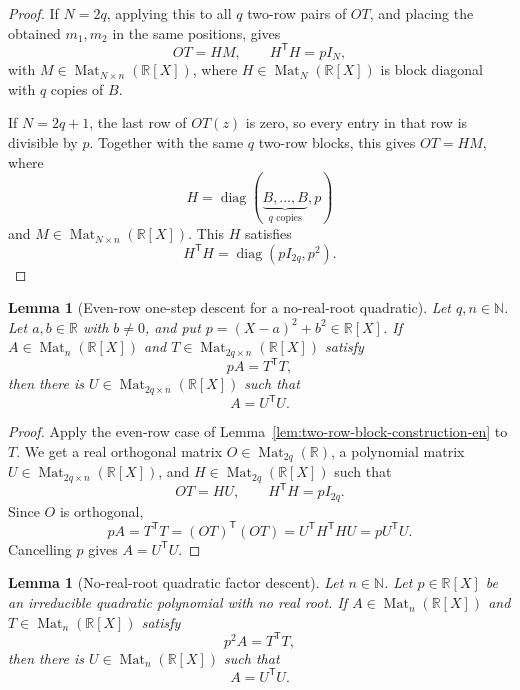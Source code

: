 \documentclass[uplatex,dvipdfmx]{jsarticle}
\newcommand{\Poly}{\mathbb{R}[X]}
\newcommand{\Mat}{\operatorname{Mat}}
\theoremstyle{matrixsosdefinition}
\newtheorem{lemma}[theorem]{Lemma}
\begin{document}
\begin{proof}
  If \(N=2q\), applying this to all \(q\) two-row pairs of \(OT\), and placing
  the obtained \(m_1,m_2\) in the same positions, gives
  \[
    OT=HM,\qquad H^{\mathsf T}H=pI_N,
  \]
  with \(M\in\Mat_{N\times n}(\Poly)\), where \(H\in\Mat_N(\Poly)\) is
  block diagonal with \(q\) copies of \(B\).

  If \(N=2q+1\), the last row of \(OT(z)\) is zero, so every entry in that row
  is divisible by \(p\).  Together with the same \(q\) two-row blocks, this gives
  \(OT=HM\), where
  \[
    H=\operatorname{diag}(\underbrace{B,\ldots,B}_{q\text{ copies}},p)
  \]
  and \(M\in\Mat_{N\times n}(\Poly)\).  This \(H\) satisfies
  \[
    H^{\mathsf T}H=\operatorname{diag}(pI_{2q},p^2).
  \]
\end{proof}

\begin{lemma}[Even-row one-step descent for a no-real-root quadratic]
\label{lem:no-real-root-even-row-one-step-en}
  Let \(q,n\in\mathbb{N}\).
  Let \(a,b\in\mathbb{R}\) with \(b\ne0\), and put
  \(p=(X-a)^2+b^2\in\Poly\).
  If \(A\in\Mat_n(\Poly)\) and \(T\in\Mat_{2q\times n}(\Poly)\) satisfy
  \[
    pA=T^{\mathsf T}T,
  \]
  then there is \(U\in\Mat_{2q\times n}(\Poly)\) such that
  \[
    A=U^{\mathsf T}U.
  \]
\end{lemma}

\begin{proof}
  Apply the even-row case of Lemma~\ref{lem:two-row-block-construction-en} to \(T\).
  We get a real orthogonal matrix \(O\in\Mat_{2q}(\mathbb{R})\), a polynomial matrix
  \(U\in\Mat_{2q\times n}(\Poly)\), and \(H\in\Mat_{2q}(\Poly)\) such that
  \[
    OT=HU,\qquad H^{\mathsf T}H=pI_{2q}.
  \]
  Since \(O\) is orthogonal,
  \[
    pA=T^{\mathsf T}T
      =(OT)^{\mathsf T}(OT)
      =U^{\mathsf T}H^{\mathsf T}HU
      =pU^{\mathsf T}U.
  \]
  Cancelling \(p\) gives \(A=U^{\mathsf T}U\).
\end{proof}

\begin{lemma}[No-real-root quadratic factor descent]
\label{lem:no-real-root-quadratic-factor-descent-en}
  Let \(n\in\mathbb{N}\).
  Let \(p\in\Poly\) be an irreducible quadratic polynomial with no real root.
  If \(A\in\Mat_n(\Poly)\) and \(T\in\Mat_n(\Poly)\) satisfy
  \[
    p^2A=T^{\mathsf T}T,
  \]
  then there is \(U\in\Mat_n(\Poly)\) such that
  \[
    A=U^{\mathsf T}U.
  \]
\end{lemma}
\end{document}

